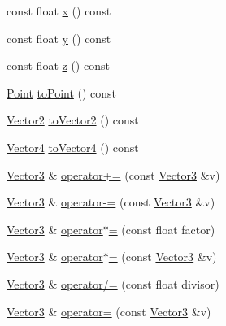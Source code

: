 \begin{DoxyCompactItemize}
const float \hyperlink{classprism_1_1geometry_1_1_vector3_a626b13c89f5ba60b85f8e0b7898efddb}{x} () const 
\item 
const float \hyperlink{classprism_1_1geometry_1_1_vector3_aee1ad3f7afd357faa521832508fd1611}{y} () const 
\item 
const float \hyperlink{classprism_1_1geometry_1_1_vector3_aed8ff88f798babae79a5ccb706d0b761}{z} () const 
\item 
\hyperlink{classprism_1_1geometry_1_1_point}{Point} \hyperlink{classprism_1_1geometry_1_1_vector3_a37d60b4061540116a98bbe0bc0b7c6e0}{to\+Point} () const 
\item 
\hyperlink{classprism_1_1geometry_1_1_vector2}{Vector2} \hyperlink{classprism_1_1geometry_1_1_vector3_a75eaa46272b3f6fe77db8542d806127a}{to\+Vector2} () const 
\item 
\hyperlink{classprism_1_1geometry_1_1_vector4}{Vector4} \hyperlink{classprism_1_1geometry_1_1_vector3_ae40a599d8815aacd7434cc168b5a9ff7}{to\+Vector4} () const 
\item 
\hyperlink{classprism_1_1geometry_1_1_vector3}{Vector3} \& \hyperlink{classprism_1_1geometry_1_1_vector3_a44114d8dfa05dc64aba3ba42a411efdc}{operator+=} (const \hyperlink{classprism_1_1geometry_1_1_vector3}{Vector3} \&v)
\item 
\hyperlink{classprism_1_1geometry_1_1_vector3}{Vector3} \& \hyperlink{classprism_1_1geometry_1_1_vector3_ac9678cdf810d7b6e4df907760e475ea6}{operator-\/=} (const \hyperlink{classprism_1_1geometry_1_1_vector3}{Vector3} \&v)
\item 
\hyperlink{classprism_1_1geometry_1_1_vector3}{Vector3} \& \hyperlink{classprism_1_1geometry_1_1_vector3_a1c317ce297e54b1d4f2c932b42deb6df}{operator$\ast$=} (const float factor)
\item 
\hyperlink{classprism_1_1geometry_1_1_vector3}{Vector3} \& \hyperlink{classprism_1_1geometry_1_1_vector3_a06b98390ae9142546875d1677b6e5b47}{operator$\ast$=} (const \hyperlink{classprism_1_1geometry_1_1_vector3}{Vector3} \&v)
\item 
\hyperlink{classprism_1_1geometry_1_1_vector3}{Vector3} \& \hyperlink{classprism_1_1geometry_1_1_vector3_aed079a91c5a9fc8920703b90a6109b73}{operator/=} (const float divisor)
\item 
\hyperlink{classprism_1_1geometry_1_1_vector3}{Vector3} \& \hyperlink{classprism_1_1geometry_1_1_vector3_a3cad552160c4977b02110fdac74dfcd8}{operator=} (const \hyperlink{classprism_1_1geometry_1_1_vector3}{Vector3} \&v)
\end{DoxyCompactItemize}

